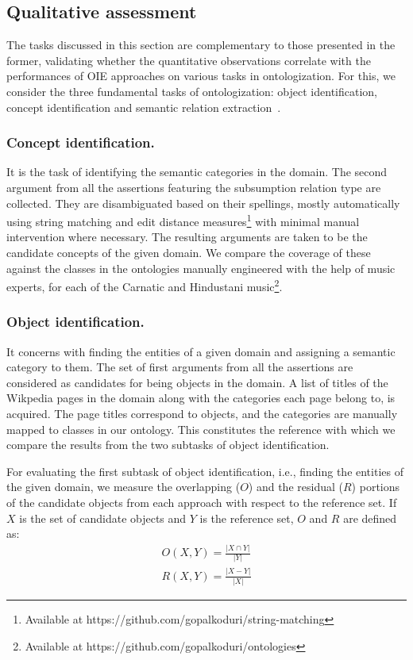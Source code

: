 \documentclass{llncs}
\begin{document}
\subsection{Qualitative assessment}
The tasks discussed in this section are complementary to those presented in the former, validating whether the quantitative observations correlate with the performances of OIE approaches on various tasks in ontologization. For this, we consider the three fundamental tasks of ontologization: object identification, concept identification and semantic relation extraction~\cite{Petasis2011}. 

\subsubsection{Concept identification.} It is the task of identifying the semantic categories in the domain. The second argument from all the assertions featuring the subsumption relation type are collected. They are disambiguated based on their spellings, mostly automatically using string matching and edit distance measures\footnote{Available at https://github.com/gopalkoduri/string-matching} with minimal manual intervention where necessary. The resulting arguments are taken to be the candidate concepts of the given domain. We compare the coverage of these against the classes in the ontologies manually engineered with the help of music experts, for each of the Carnatic and Hindustani music\footnote{Available at https://github.com/gopalkoduri/ontologies}.

\subsubsection{Object identification.} It concerns with finding the entities of a given domain and assigning a semantic category to them. The set of first arguments from all the assertions are considered as candidates for being objects in the domain. A list of titles of the Wikpedia pages in the domain along with the categories each page belong to, is acquired. The page titles correspond to objects, and the categories are manually mapped to classes in our ontology. This constitutes the reference with which we compare the results from the two subtasks of object identification.

For evaluating the first subtask of object identification, i.e., finding the entities of the given domain, we measure the overlapping ($O$) and the residual ($R$) portions of the candidate objects from each approach with respect to the reference set. If $X$ is the set of candidate objects and $Y$ is the reference set, $O$ and $R$ are defined as:
\begin{eqnarray}
\label{eq:overlap}
O(X, Y) = \frac{\left|X \cap Y \right|}{\left|Y\right|} \\\nonumber
R(X, Y) = \frac{\left|X - Y \right|}{\left|X\right|}
\end{eqnarray}
\end{document}
